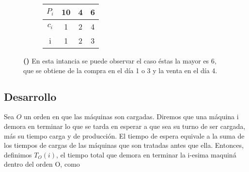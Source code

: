 \vspace{2em}
\begin{figure}[h!]
    \begin{center}
        \begin{minipage}[c]{\figurewidth}
            \begin{center}
                
                \begin{subfigure}{1\textwidth}
                    \centering
                    \begin{tabular}[c]{|c|c|c|c|}
                        \hline
                        $P_i$ & 10 & 4 & 6 \\
                        \hline
                        $c_i$ &  1 & 2 & 4  \\
                        \hline
                        \rowcolor[gray]{.9}
                        i & 1 & 2 & 3  \\
                        \hline
                    \end{tabular}
                    \caption{ }
                    \label{fig:ej1EjemploDecreciente}
                \vspace{2ex}
                \end{subfigure}
                
              \caption{\textbf{()} En esta intancia se puede observar el caso
                                  \'estas la mayor es 6, que se obtiene de la compra en el d\'ia 1 o 3 y la venta en el d\'ia 4.}   
                \label{fig:ej1Ejemplos}
            \end{center}
        \end{minipage}
    \end{center}
\end{figure}
 
 
\subsection{Desarrollo}
 
 
Sea $O$ un orden en que las m\'aquinas son cargadas.
Diremos que una m\'aquina i demora en terminar lo que se tarda en esperar a que sea su turno de ser cargada, m\'as su tiempo carga y de producci\'on.
El tiempo de espera equivale a la suma de los tiempos de cargas de las m\'aquinas que son tratadas antes que ella. 
Entonces, definimos $T_{O}(i)$, el tiempo total que demora en terminar la i-esima maquin\'a dentro del orden O, como 
 
